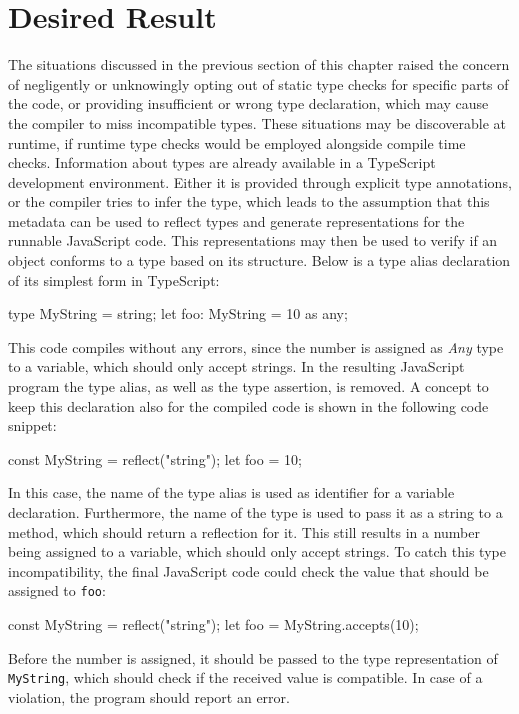 \section{Desired Result}
\label{sec:desired-result}

The situations discussed in the previous section of this chapter raised the concern of negligently or unknowingly opting out of static type checks for specific parts of the code, or providing insufficient or wrong type declaration, which may cause the compiler to miss incompatible types. These situations may be discoverable at runtime, if runtime type checks would be employed alongside compile time checks. Information about types are already available in a TypeScript development environment. Either it is provided through explicit type annotations, or the compiler tries to infer the type, which leads to the assumption that this metadata can be used to reflect types and generate representations for the runnable JavaScript code. This representations may then be used to verify if an object conforms to a type based on its structure. Below is a type alias declaration of its simplest form in TypeScript:
\begin{JsCode}[numbers=none]
type MyString = string;
let foo: MyString = 10 as any;
\end{JsCode}
This code compiles without any errors, since the number is assigned as \emph{Any} type to a variable, which should only accept strings. In the resulting JavaScript program the type alias, as well as the type assertion, is removed. A concept to keep this declaration also for the compiled code is shown in the following code snippet:
\begin{JsCode}[numbers=none]
const MyString = reflect("string");
let foo = 10;
\end{JsCode}
In this case, the name of the type alias is used as identifier for a variable declaration. Furthermore, the name of the type is used to pass it as a string to a method, which should return a reflection for it. This still results in a number being assigned to a variable, which should only accept strings. To catch this type incompatibility, the final JavaScript code could check the value that should be assigned to \texttt{foo}:
\begin{JsCode}[numbers=none]
const MyString = reflect("string");
let foo = MyString.accepts(10);
\end{JsCode}
Before the number is assigned, it should be passed to the type representation of \texttt{MyString}, which should check if the received value is compatible. In case of a violation, the program should report an error.

